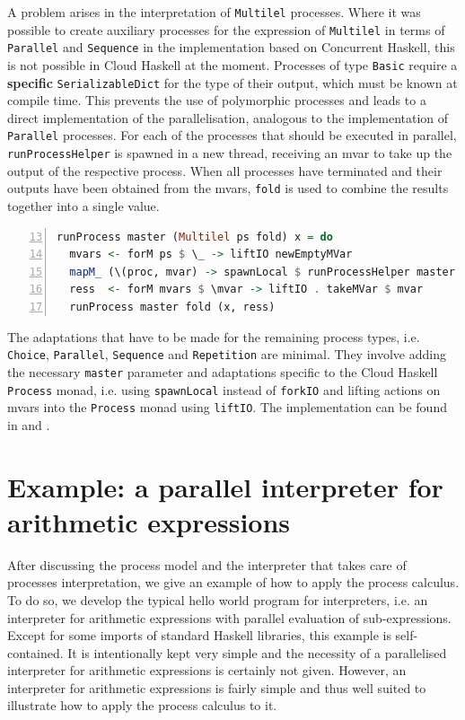 A problem arises in the interpretation of \texttt{Multilel} processes. Where it was possible to create auxiliary processes for the expression of \texttt{Multilel} in terms of \texttt{Parallel} and \texttt{Sequence} in the implementation based on \textsf{Concurrent Haskell}, this is not possible in \textsf{Cloud Haskell} at the moment. Processes of type \texttt{Basic} require a \textbf{specific} \texttt{SerializableDict} for the type of their output, which must be known at compile time. This prevents the use of polymorphic processes and leads to a direct implementation of the parallelisation, analogous to the implementation of \texttt{Parallel} processes. For each of the processes that should be executed in parallel, \texttt{runProcessHelper} is spawned in a new thread, receiving an mvar to take up the output of the respective process. When all processes have terminated and their outputs have been obtained from the mvars, \texttt{fold} is used to combine the results together into a single value.
\begin{lstlisting}[language=Haskell,caption=Implementation of the interpreter for \texttt{Multilel} processes.,label=lst:runprocess_multilel,numbers=left,frame=bt,firstnumber=13]
runProcess master (Multilel ps fold) x = do
  mvars <- forM ps $ \_ -> liftIO newEmptyMVar
  mapM_ (\(proc, mvar) -> spawnLocal $ runProcessHelper master proc x mvar) (ps `zip` mvars)
  ress  <- forM mvars $ \mvar -> liftIO . takeMVar $ mvar
  runProcess master fold (x, ress)
\end{lstlisting}

The adaptations that have to be made for the remaining process types, i.e. \texttt{Choice}, \texttt{Parallel}, \texttt{Sequence} and \texttt{Repetition} are minimal. They involve adding the necessary \texttt{master} parameter and adaptations specific to the \textsf{Cloud Haskell} \texttt{Process} monad, i.e. using \texttt{spawnLocal} instead of \texttt{forkIO} and lifting actions on mvars into the \texttt{Process} monad using \texttt{liftIO}. The implementation can be found in  and .


\clearpage
\section{Example: a parallel interpreter for arithmetic expressions}
\label{chp:example}
After discussing the process model and the interpreter that takes care of processes interpretation, we give an example of how to apply the process calculus. To do so, we develop the typical hello world program for interpreters, i.e. an interpreter for arithmetic expressions with parallel evaluation of sub-expressions. Except for some imports of standard \textsf{Haskell} libraries, this example is self-contained. It is intentionally kept very simple and the necessity of a parallelised interpreter for arithmetic expressions is certainly not given. However, an interpreter for arithmetic expressions is fairly simple and thus well suited to illustrate how to apply the process calculus to it.

